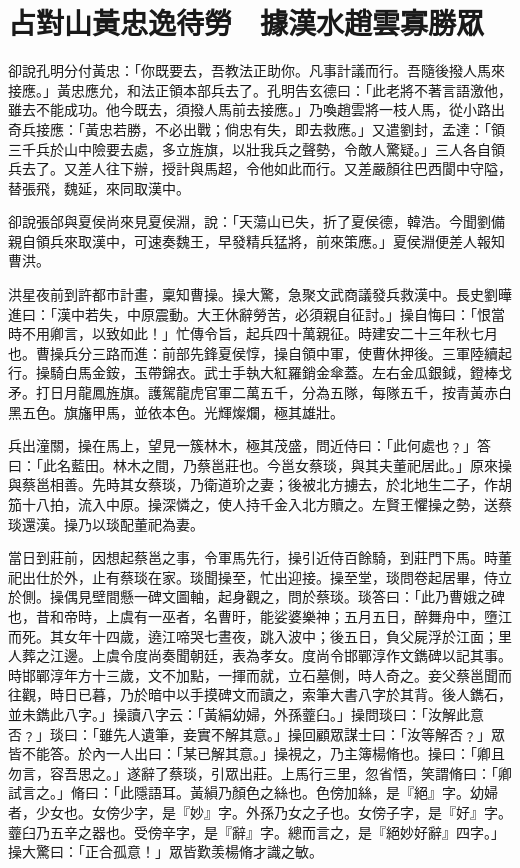 
\chapter{占對山黃忠逸待勞　據漢水趙雲寡勝眾}

卻說孔明分付黃忠：「你既要去，吾教法正助你。凡事計議而行。吾隨後撥人馬來接應。」黃忠應允，和法正領本部兵去了。孔明告玄德曰：「此老將不著言語激他，雖去不能成功。他今既去，須撥人馬前去接應。」乃喚趙雲將一枝人馬，從小路出奇兵接應：「黃忠若勝，不必出戰；倘忠有失，即去救應。」又遣劉封，孟達：「領三千兵於山中險要去處，多立旌旗，以壯我兵之聲勢，令敵人驚疑。」三人各自領兵去了。又差人往下辦，授計與馬超，令他如此而行。又差嚴顏往巴西閬中守隘，替張飛，魏延，來同取漢中。

卻說張郃與夏侯尚來見夏侯淵，說：「天蕩山已失，折了夏侯德，韓浩。今聞劉備親自領兵來取漢中，可速奏魏王，早發精兵猛將，前來策應。」夏侯淵便差人報知曹洪。

洪星夜前到許都市計畫，稟知曹操。操大驚，急聚文武商議發兵救漢中。長史劉曄進曰：「漢中若失，中原震動。大王休辭勞苦，必須親自征討。」操自悔曰：「恨當時不用卿言，以致如此！」忙傳令旨，起兵四十萬親征。時建安二十三年秋七月也。曹操兵分三路而進：前部先鋒夏侯惇，操自領中軍，使曹休押後。三軍陸續起行。操騎白馬金銨，玉帶錦衣。武士手執大紅羅銷金傘蓋。左右金瓜銀鉞，鐙棒戈矛。打日月龍鳳旌旗。護駕龍虎官軍二萬五千，分為五隊，每隊五千，按青黃赤白黑五色。旗旛甲馬，並依本色。光輝燦爛，極其雄壯。

兵出潼關，操在馬上，望見一簇林木，極其茂盛，問近侍曰：「此何處也﹖」答曰：「此名藍田。林木之間，乃蔡邕莊也。今邕女蔡琰，與其夫董祀居此。」原來操與蔡邕相善。先時其女蔡琰，乃衛道玠之妻；後被北方擄去，於北地生二子，作胡笳十八拍，流入中原。操深憐之，使人持千金入北方贖之。左賢王懼操之勢，送蔡琰還漢。操乃以琰配董祀為妻。

當日到莊前，因想起蔡邕之事，令軍馬先行，操引近侍百餘騎，到莊門下馬。時董祀出仕於外，止有蔡琰在家。琰聞操至，忙出迎接。操至堂，琰問卷起居畢，侍立於側。操偶見壁間懸一碑文圖軸，起身觀之，問於蔡琰。琰答曰：「此乃曹娥之碑也，昔和帝時，上虞有一巫者，名曹旴，能娑婆樂神；五月五日，醉舞舟中，墮江而死。其女年十四歲，遶江啼哭七晝夜，跳入波中；後五日，負父屍浮於江面；里人葬之江邊。上虞令度尚奏聞朝廷，表為孝女。度尚令邯鄲淳作文鐫碑以記其事。時邯鄲淳年方十三歲，文不加點，一揮而就，立石墓側，時人奇之。妾父蔡邕聞而往觀，時日已暮，乃於暗中以手摸碑文而讀之，索筆大書八字於其背。後人鐫石，並未鐫此八字。」操讀八字云：「黃絹幼婦，外孫虀臼。」操問琰曰：「汝解此意否﹖」琰曰：「雖先人遺筆，妾實不解其意。」操回顧眾謀士曰：「汝等解否﹖」眾皆不能答。於內一人出曰：「某已解其意。」操視之，乃主簿楊脩也。操曰：「卿且勿言，容吾思之。」遂辭了蔡琰，引眾出莊。上馬行三里，忽省悟，笑謂脩曰：「卿試言之。」脩曰：「此隱語耳。黃縜乃顏色之絲也。色傍加絲，是『絕』字。幼婦者，少女也。女傍少字，是『妙』字。外孫乃女之子也。女傍子字，是『好』字。虀臼乃五辛之器也。受傍辛字，是『辭』字。總而言之，是『絕妙好辭』四字。」操大驚曰：「正合孤意！」眾皆歎羡楊脩才識之敏。

